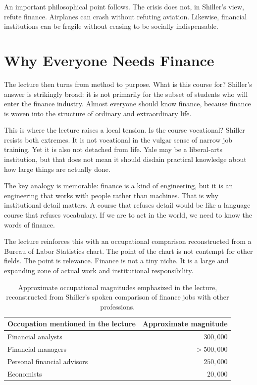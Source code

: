 An important philosophical point follows. The crisis does not, in Shiller's view, refute finance. Airplanes can crash without refuting aviation. Likewise, financial institutions can be fragile without ceasing to be socially indispensable.

\section{Why Everyone Needs Finance}

The lecture then turns from method to purpose. What is this course for? Shiller's answer is strikingly broad: it is not primarily for the subset of students who will enter the finance industry. Almost everyone should know finance, because finance is woven into the structure of ordinary and extraordinary life.

This is where the lecture raises a local tension. Is the course vocational? Shiller resists both extremes. It is not vocational in the vulgar sense of narrow job training. Yet it is also not detached from life. Yale may be a liberal-arts institution, but that does not mean it should disdain practical knowledge about how large things are actually done.

The key analogy is memorable: finance is a kind of engineering, but it is an engineering that works with people rather than machines. That is why institutional detail matters. A course that refuses detail would be like a language course that refuses vocabulary. If we are to act in the world, we need to know the words of finance.

The lecture reinforces this with an occupational comparison reconstructed from a Bureau of Labor Statistics chart. The point of the chart is not contempt for other fields. The point is relevance. Finance is not a tiny niche. It is a large and expanding zone of actual work and institutional responsibility.

\begin{table}[h]
\centering
\begin{tabular}{|l|r|}
\hline
Occupation mentioned in the lecture & Approximate magnitude \\
\hline
Financial analysts & \(300{,}000\) \\
Financial managers & \(>500{,}000\) \\
Personal financial advisors & \(250{,}000\) \\
Economists & \(20{,}000\) \\
\hline
\end{tabular}
\caption{Approximate occupational magnitudes emphasized in the lecture, reconstructed from Shiller's spoken comparison of finance jobs with other professions.}
\end{table}

